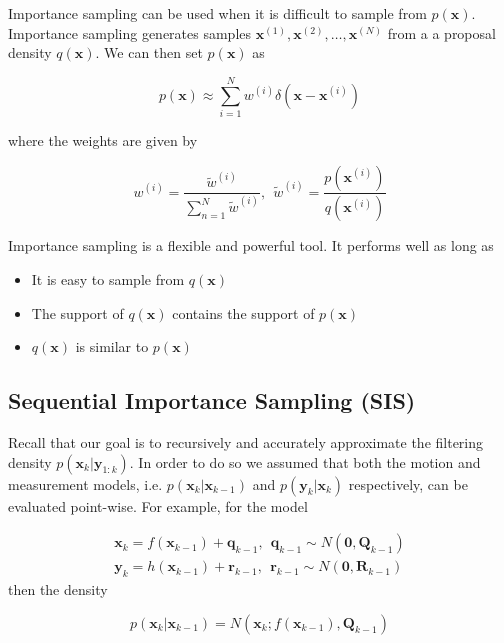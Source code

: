 Importance sampling can be used when it is difficult to sample from $p(\mathbf{x})$. Importance sampling generates samples
$\mathbf{x}^{(1)}, \mathbf{x}^{(2)}, \ldots, \mathbf{x}^{(N)}$ from a a proposal density $q(\mathbf{x})$. We can then set $p(\mathbf{x})$ as

\begin{equation}
p(\mathbf{x}) \approx \sum_{i=1}^N w^{(i)} \delta (\mathbf{x} -\mathbf{x}^{(i)})
\end{equation} 

where the weights are given by

\begin{equation}
w^{(i)} = \frac{\tilde{w}^{(i)}}{\sum_{n=1}^N \tilde{w}^{(i)}}, ~~ \tilde{w}^{(i)} = \frac{p(\mathbf{x}^{(i)})}{q(\mathbf{x}^{(i)})}
\end{equation}

Importance sampling is a flexible and powerful tool. It performs well as long as

\begin{itemize}
\item It is easy to sample from $q(\mathbf{x})$
\item The support of $q(\mathbf{x})$ contains the support of $p(\mathbf{x})$
\item $q(\mathbf{x})$ is similar to $p(\mathbf{x})$
\end{itemize}

\subsection{Sequential Importance Sampling (SIS)}
\label{sequential_importance_sampling}

Recall that our goal is to recursively and accurately approximate the filtering density $p(\mathbf{x}_k | \mathbf{y}_{1:k})$.
In order to do so we assumed that both the motion and measurement models, i.e. $p(\mathbf{x}_k | \mathbf{x}_{k-1})$ and $p(\mathbf{y}_k | \mathbf{x}_{k})$
respectively, can be evaluated point-wise. For example, for the model 

\begin{eqnarray}
\mathbf{x}_k = f(\mathbf{x}_{k-1}) + \mathbf{q}_{k-1}, ~~ \mathbf{q}_{k-1} \sim N(\mathbf{0}, \mathbf{Q}_{k-1}) \\
\mathbf{y}_k = h(\mathbf{x}_{k-1}) + \mathbf{r}_{k-1}, ~~ \mathbf{r}_{k-1} \sim N(\mathbf{0}, \mathbf{R}_{k-1}) 
\end{eqnarray}
then the density 

\begin{equation}
p(\mathbf{x}_k | \mathbf{x}_{k-1}) = N(\mathbf{x}_k; f(\mathbf{x}_{k-1}), \mathbf{Q}_{k-1})
\end{equation}

